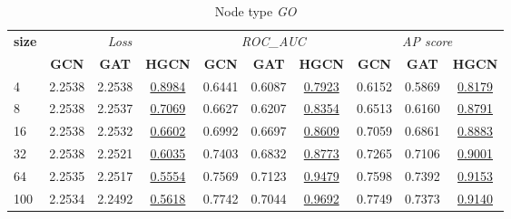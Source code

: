 \begin{table}
    \begin{subtable}[t]{\textwidth}
        \centering
        \begin{tabular}{l|ccc|ccc|ccc}   
             \toprule
                \multirow{2}{*}{\textbf{size}} & \multicolumn{3}{c|}{\textit{Loss}} & \multicolumn{3}{c|}{\textit{ROC\_AUC}} & \multicolumn{3}{c}{\textit{AP score}} \\
                & \textbf{GCN} & \textbf{GAT} & \textbf{HGCN} & \textbf{GCN} & \textbf{GAT} & \textbf{HGCN} & \textbf{GCN} & \textbf{GAT} & \textbf{HGCN} \\
                \midrule
                4 & 2.2538 & 2.2538 & \underline{0.8984} & 0.6441 & 0.6087 & \underline{0.7923} & 0.6152 & 0.5869 & \underline{0.8179} \\
                8 & 2.2538 & 2.2537 & \underline{0.7069} & 0.6627 & 0.6207 & \underline{0.8354} & 0.6513 & 0.6160 & \underline{0.8791} \\
                16 & 2.2538 & 2.2532 & \underline{0.6602} & 0.6992 & 0.6697 & \underline{0.8609} & 0.7059 & 0.6861 & \underline{0.8883} \\
                32 & 2.2538 & 2.2521 & \underline{0.6035} & 0.7403 & 0.6832 & \underline{0.8773} & 0.7265 & 0.7106 & \underline{0.9001} \\
                64 & 2.2535 & 2.2517 & \underline{0.5554} & 0.7569 & 0.7123 & \underline{0.9479} & 0.7598 & 0.7392 & \underline{0.9153} \\
                100 & 2.2534 & 2.2492 & \underline{0.5618} & 0.7742 & 0.7044 & \underline{0.9692} & 0.7749 & 0.7373 & \underline{0.9140} \\
                \bottomrule
        \end{tabular}
        \caption{Node type \textit{GO}}
    \end{subtable}
    
    \vspace{1em}
    

\end{table}
